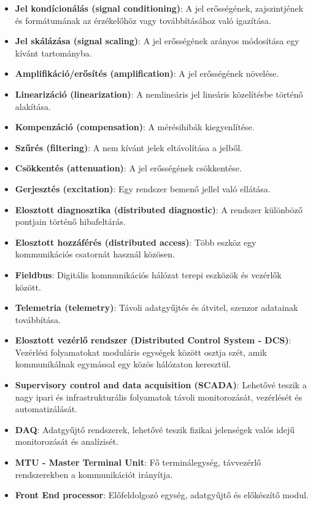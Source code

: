 \begin{itemize}
    \item \textbf{Jel kondícionálás (signal conditioning)}: A jel erősségének, zajszintjének és formátumának az érzékelőhöz vagy továbbításához való igazítása.
    \item \textbf{Jel skálázása (signal scaling)}: A jel erősségének arányos módosítása egy kívánt tartományba.
    \item \textbf{Amplifikáció/erősítés (amplification)}: A jel erősségének növelése.
    \item \textbf{Linearizáció (linearization)}: A nemlineáris jel lineáris közelítésbe történő alakítása.
    \item \textbf{Kompenzáció (compensation)}: A mérésihibák kiegyenlítése.
    \item \textbf{Szűrés (filtering)}: A nem kívánt jelek eltávolítása a jelből.
    \item \textbf{Csökkentés (attenuation)}: A jel erősségének csökkentése.
    \item \textbf{Gerjesztés (excitation)}: Egy rendszer bemenő jellel való ellátása.
    \item \textbf{Elosztott diagnosztika (distributed diagnostic)}: A rendszer különböző pontjain történő hibafeltárás.
    \item \textbf{Elosztott hozzáférés (distributed access)}: Több eszköz egy kommunikációs csatornát használ közösen.
    \item \textbf{Fieldbus}: Digitális kommunikációs hálózat terepi eszközök és vezérlők között.
    \item \textbf{Telemetria (telemetry)}: Távoli adatgyűjtés és átvitel, szenzor adatainak továbbítása.
    \item \textbf{Elosztott vezérlő rendszer (Distributed Control System - DCS)}: Vezérlési folyamatokat moduláris egységek között osztja szét, amik kommunikálnak egymással egy közös hálózaton keresztül.
    \item \textbf{Supervisory control and data acquisition (SCADA)}: Lehetővé teszik a nagy ipari és infrastrukturális folyamatok távoli monitorozását, vezérlését és automatizálását.
    \item \textbf{DAQ}: Adatgyűjtő rendszerek, lehetővé teszik fizikai jelenségek valós idejű monitorozását és analízisét.
    \item \textbf{MTU - Master Terminal Unit}: Fő terminálegység, távvezérlő rendszerekben a kommunikációt irányítja.
    \item \textbf{Front End processor}: Előfeldolgozó egység, adatgyűjtő és előkészítő modul.

\end{itemize}
